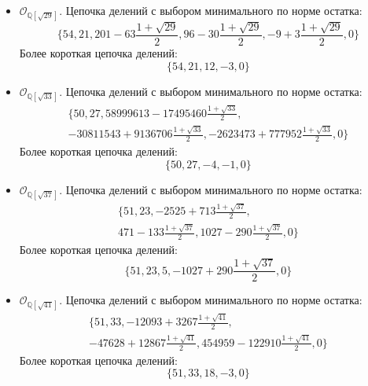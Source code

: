 \documentclass[_00_dissertation.tex]{subfiles}
\begin{document}
\begin{itemize}
    \item $\mathcal{O}_{\mathbb{Q}[\sqrt{29}]}$.
    Цепочка делений с выбором минимального по норме остатка:
    \begin{equation*}
        \{54, 21, 201-63\frac{1+\sqrt{29}}{2}, 96-30\frac{1+\sqrt{29}}{2}, -9+3\frac{1+\sqrt{29}}{2}, 0\}
    \end{equation*}
    Более короткая цепочка делений:
    \begin{equation*}
        \{54, 21, 12, -3, 0\}
    \end{equation*}

    \item $\mathcal{O}_{\mathbb{Q}[\sqrt{33}]}$.
    Цепочка делений с выбором минимального по норме остатка:
    \begin{multline*}
        \{50, 27, 58999613-17495460\frac{1+\sqrt{33}}{2},\\
        -30811543+9136706\frac{1+\sqrt{33}}{2}, -2623473+777952\frac{1+\sqrt{33}}{2}, 0\}
    \end{multline*}
    Более короткая цепочка делений:
    \begin{equation*}
        \{50, 27, -4, -1, 0\}
    \end{equation*}

    \item $\mathcal{O}_{\mathbb{Q}[\sqrt{37}]}$.
    Цепочка делений с выбором минимального по норме остатка:
    \begin{multline*}
        \{51, 23, -2525+713\frac{1+\sqrt{37}}{2},\\
        471-133\frac{1+\sqrt{37}}{2}, 1027-290\frac{1+\sqrt{37}}{2}, 0\}
    \end{multline*}
    Более короткая цепочка делений:
    \begin{equation*}
        \{51, 23, 5, -1027+290\frac{1+\sqrt{37}}{2}, 0\}
    \end{equation*}

    \item $\mathcal{O}_{\mathbb{Q}[\sqrt{41}]}$.
    Цепочка делений с выбором минимального по норме остатка:
    \begin{multline*}
        \{51, 33, -12093+3267\frac{1+\sqrt{41}}{2},\\
        -47628+12867\frac{1+\sqrt{41}}{2}, 454959-122910\frac{1+\sqrt{41}}{2}, 0\}
    \end{multline*}
    Более короткая цепочка делений:
    \begin{equation*}
        \{51, 33, 18, -3, 0\}
    \end{equation*}


\end{itemize}
\end{document}

